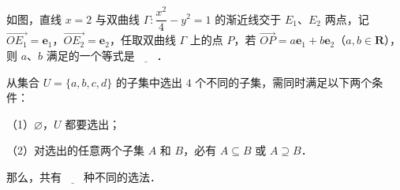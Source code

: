 \endgroup
\begingroup
\renewenvironment{question}{\Needspace{0.5\textheight}}{}
\begin{question}
如图，直线 $x=2$ 与双曲线 $\Gamma:\dfrac{x^2}4-y^2=1$ 的渐近线交于 $E_1$、$E_2$ 两点，记 $\overrightarrow{OE_1}=\boldsymbol e_1$，$\overrightarrow{OE_2}=\boldsymbol e_2$，任取双曲线 $\Gamma$ 上的点 $P$，若 $\overrightarrow{OP}=a\boldsymbol e_1+b\boldsymbol e_2$（$a,b\in\mathbf R$），则 $a$、$b$ 满足的一个等式是$\underline{\qquad}$．
\nopagebreak[4]
\begin{center}\end{center}
\nopagebreak[4]
\end{question}
\endgroup
\begin{question}
从集合 $U=\{a,b,c,d\}$ 的子集中选出 $4$ 个不同的子集，需同时满足以下两个条件：

（1）$\varnothing$，$U$ 都要选出；

（2）对选出的任意两个子集 $A$ 和 $B$，必有 $A\subseteq B$ 或 $A\supseteq B$．

那么，共有$\underline{\qquad}$种不同的选法．

\end{question}

